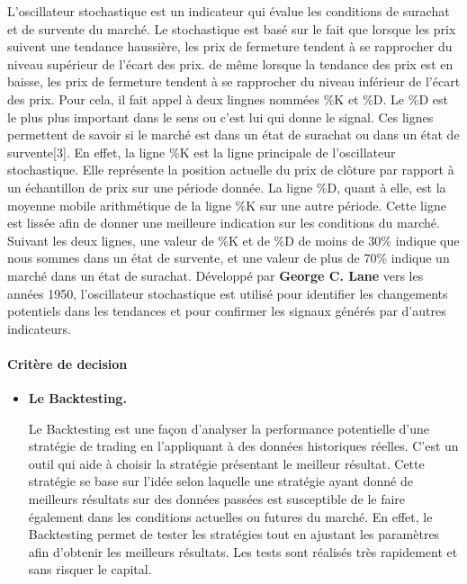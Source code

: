 \begin{itemize}
  {L'oscillateur stochastique est un indicateur qui évalue les
  conditions de surachat et de survente du marché. Le stochastique est
  basé sur le fait que lorsque les prix suivent une tendance haussière,
  les prix de fermeture tendent à se rapprocher du niveau supérieur de
  l'écart des prix. de même lorsque la tendance des prix est en baisse,
  les prix de fermeture tendent à se rapprocher du niveau inférieur de
  l'écart des prix. Pour cela, il fait appel à deux lingnes nommées \%K
  et \%D. Le \%D est le plus plus important dans le sens ou c'est lui
  qui donne le signal. Ces lignes permettent de savoir si le marché est
  dans un état de surachat ou dans un état de survente{[}3{]}. En effet,
  la ligne \%K est la ligne principale de l'oscillateur stochastique.
  Elle représente la position actuelle du prix de clôture par rapport à
  un échantillon de prix sur une période donnée. La ligne \%D, quant à
  elle, est la moyenne mobile arithmétique de la ligne \%K sur une autre
  période. Cette ligne est lissée afin de donner une meilleure
  indication sur les conditions du marché. Suivant les deux lignes, une
  valeur de \%K et de \%D de moins de 30\% indique que nous sommes dans
  un état de survente, et une valeur de plus de 70\% indique un marché
  dans un état de surachat. Développé par \textbf{George C. Lane} vers
  les années 1950, l'oscillateur stochastique est utilisé pour
  identifier les changements potentiels dans les tendances et pour
  confirmer les signaux générés par d'autres indicateurs.}
\end{itemize}

\paragraph{\texorpdfstring{Critère de decision
}{Critère de decision }}\label{crituxe8re-de-decision}

\begin{itemize}
\item
  \textbf{Le Backtesting.}

  {Le Backtesting est une façon d'analyser la performance potentielle
  d'une stratégie de trading en l'appliquant à des données historiques
  réelles. C'est un outil qui aide à choisir la stratégie présentant le
  meilleur résultat. Cette stratégie se base sur l'idée selon laquelle
  une stratégie ayant donné de meilleurs résultats sur des données
  passées est susceptible de le faire également dans les conditions
  actuelles ou futures du marché. En effet, le Backtesting permet de
  tester les stratégies tout en ajustant les paramètres afin d'obtenir
  les meilleurs résultats. Les tests sont réalisés très rapidement et
  sans risquer le capital.}
\end{itemize}

